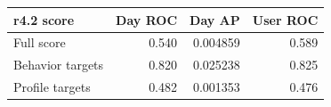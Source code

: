 \begin{tabular}{lrrr}
\toprule
r4.2 score & Day ROC & Day AP & User ROC \\
\midrule
Full score & 0.540 & 0.004859 & 0.589 \\
Behavior targets & 0.820 & 0.025238 & 0.825 \\
Profile targets & 0.482 & 0.001353 & 0.476 \\
\bottomrule
\end{tabular}
